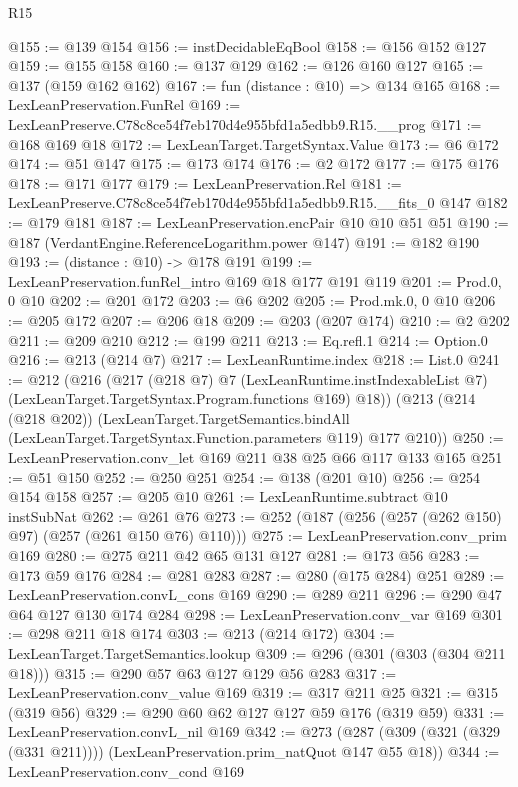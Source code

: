 \begin{lexlean}{R15}
\begin{coremodule}
@155 := @139 @154
@156 := instDecidableEqBool
@158 := @156 @152 @127
@159 := @155 @158
@160 := @137 @129
@162 := @126 @160 @127
@165 := @137 (@159 @162 @162)
@167 := fun (distance : @10) => @134 @165
@168 := LexLeanPreservation.FunRel
@169 := LexLeanPreserve.C78c8ce54f7eb170d4e955bfd1a5edbb9.R15.__prog
@171 := @168 @169 @18
@172 := LexLeanTarget.TargetSyntax.Value
@173 := @6 @172
@174 := @51 @147
@175 := @173 @174
@176 := @2 @172
@177 := @175 @176
@178 := @171 @177
@179 := LexLeanPreservation.Rel
@181 := LexLeanPreserve.C78c8ce54f7eb170d4e955bfd1a5edbb9.R15.__fits_0 @147
@182 := @179 @181
@187 := LexLeanPreservation.encPair @10 @10 @51 @51
@190 := @187 (VerdantEngine.ReferenceLogarithm.power @147)
@191 := @182 @190
@193 := (distance : @10) -> @178 @191
@199 := LexLeanPreservation.funRel_intro @169 @18 @177 @191 @119
@201 := Prod.{0, 0} @10
@202 := @201 @172
@203 := @6 @202
@205 := Prod.mk.{0, 0} @10
@206 := @205 @172
@207 := @206 @18
@209 := @203 (@207 @174)
@210 := @2 @202
@211 := @209 @210
@212 := @199 @211
@213 := Eq.refl.{1}
@214 := Option.{0}
@216 := @213 (@214 @7)
@217 := LexLeanRuntime.index
@218 := List.{0}
@241 := @212
    (@216
      (@217
        (@218 @7)
        @7
        (LexLeanRuntime.instIndexableList @7)
        (LexLeanTarget.TargetSyntax.Program.functions @169)
        @18))
    (@213
      (@214 (@218 @202))
      (LexLeanTarget.TargetSemantics.bindAll
        (LexLeanTarget.TargetSyntax.Function.parameters @119)
        @177
        @210))
@250 := LexLeanPreservation.conv_let @169 @211 @38 @25 @66 @117 @133 @165
@251 := @51 @150
@252 := @250 @251
@254 := @138 (@201 @10)
@256 := @254 @154 @158
@257 := @205 @10
@261 := LexLeanRuntime.subtract @10 instSubNat
@262 := @261 @76
@273 := @252 (@187 (@256 (@257 (@262 @150) @97) (@257 (@261 @150 @76) @110)))
@275 := LexLeanPreservation.conv_prim @169
@280 := @275 @211 @42 @65 @131 @127
@281 := @173 @56
@283 := @173 @59 @176
@284 := @281 @283
@287 := @280 (@175 @284) @251
@289 := LexLeanPreservation.convL_cons @169
@290 := @289 @211
@296 := @290 @47 @64 @127 @130 @174 @284
@298 := LexLeanPreservation.conv_var @169
@301 := @298 @211 @18 @174
@303 := @213 (@214 @172)
@304 := LexLeanTarget.TargetSemantics.lookup
@309 := @296 (@301 (@303 (@304 @211 @18)))
@315 := @290 @57 @63 @127 @129 @56 @283
@317 := LexLeanPreservation.conv_value @169
@319 := @317 @211 @25
@321 := @315 (@319 @56)
@329 := @290 @60 @62 @127 @127 @59 @176 (@319 @59)
@331 := LexLeanPreservation.convL_nil @169
@342 := @273 (@287 (@309 (@321 (@329 (@331 @211)))) (LexLeanPreservation.prim_natQuot @147 @55 @18))
@344 := LexLeanPreservation.conv_cond @169

\end{coremodule}
\end{lexlean}
